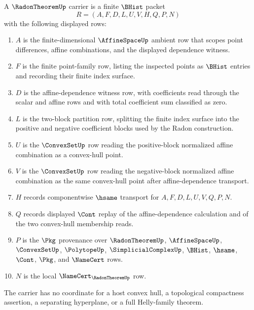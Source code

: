 \begin{definition}
\label{def:radon-theorem-finite-convex-geometry-carrier}
A $\RadonTheoremUp$ carrier is a finite $\BHist$ packet
$$
R=(A,F,D,L,U,V,H,Q,P,N)
$$
with the following displayed rows:
\begin{enumerate}
  \item $A$ is the finite-dimensional $\AffineSpaceUp$ ambient row that scopes point differences, affine combinations, and the displayed dependence witness.
  \item $F$ is the finite point-family row, listing the inspected points as $\BHist$ entries and recording their finite index surface.
  \item $D$ is the affine-dependence witness row, with coefficients read through the scalar and affine rows and with total coefficient sum classified as zero.
  \item $L$ is the two-block partition row, splitting the finite index surface into the positive and negative coefficient blocks used by the Radon construction.
  \item $U$ is the $\ConvexSetUp$ row reading the positive-block normalized affine combination as a convex-hull point.
  \item $V$ is the $\ConvexSetUp$ row reading the negative-block normalized affine combination as the same convex-hull point after affine-dependence transport.
  \item $H$ records componentwise $\hsame$ transport for $A,F,D,L,U,V,Q,P,N$.
  \item $Q$ records displayed $\Cont$ replay of the affine-dependence calculation and of the two convex-hull membership reads.
  \item $P$ is the $\Pkg$ provenance over $\RadonTheoremUp$, $\AffineSpaceUp$, $\ConvexSetUp$, $\PolytopeUp$, $\SimplicialComplexUp$, $\BHist$, $\hsame$, $\Cont$, $\Pkg$, and $\NameCert$ rows.
  \item $N$ is the local $\NameCert_{\RadonTheoremUp}$ row.
\end{enumerate}
The carrier has no coordinate for a host convex hull, a topological compactness assertion, a separating hyperplane, or a full Helly-family theorem.
\end{definition}

